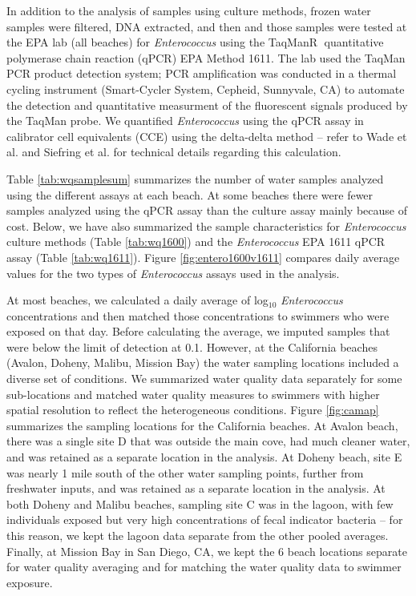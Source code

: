 \documentclass[12pt]{article}\usepackage[]{graphicx}\usepackage[]{color}
\begin{document}
In addition to the analysis of samples using culture methods, frozen water samples were filtered, DNA extracted, and then and those samples were tested at the EPA lab (all beaches) for \textit{Enterococcus} using the TaqMan\textcircled{R} quantitative polymerase chain reaction (qPCR) EPA Method 1611.\supercite{Epa2012-fb} The lab used the TaqMan PCR product detection system; PCR amplification was conducted in a thermal cycling instrument (Smart-Cycler System, Cepheid, Sunnyvale, CA) to automate the detection and quantitative measurment of the fluorescent signals produced by the TaqMan probe. We quantified \textit{Enterococcus} using the qPCR assay in calibrator cell equivalents (CCE) using the delta-delta method -- refer to Wade et al.\supercite{Wade2010-bb} and Siefring et al.\supercite{Siefring2008-au} for technical details regarding this calculation.  

Table \ref{tab:wqsamplesum} summarizes the number of water samples analyzed using the different assays at each beach. At some beaches there were fewer samples analyzed using the qPCR assay than the culture assay mainly because of cost. Below, we have also summarized the sample characteristics for \emph{Enterococcus} culture methods (Table \ref{tab:wq1600}) and the \emph{Enterococcus} EPA 1611 qPCR assay (Table \ref{tab:wq1611}).  Figure \ref{fig:entero1600v1611} compares daily average values for the two types of \textit{Enterococcus} assays used in the analysis.

At most beaches, we calculated a daily average of log$_{10}$ \textit{Enterococcus} concentrations and then matched those concentrations to swimmers who were exposed on that day.  Before calculating the average, we imputed samples that were below the limit of detection at 0.1.  However, at the California beaches (Avalon, Doheny, Malibu, Mission Bay) the water sampling locations included a diverse set of conditions. We summarized water quality data separately for some sub-locations and matched water quality measures to swimmers with higher spatial resolution to reflect the heterogeneous conditions. Figure \ref{fig:camap} summarizes the sampling locations for the California beaches. At Avalon beach, there was a single site D that was outside the main cove, had much cleaner water, and was retained as a separate location in the analysis.  At Doheny beach,  site E was nearly 1 mile south of the other water sampling points, further from freshwater inputs, and was retained as a separate location in the analysis. At both Doheny and Malibu beaches, sampling site C was in the lagoon, with few individuals exposed but very high concentrations of fecal indicator bacteria -- for this reason, we kept the lagoon data separate from the other pooled averages. Finally, at Mission Bay in San Diego, CA, we kept the 6 beach locations separate for water quality averaging and for matching the water quality data to swimmer exposure. 
\end{document}
